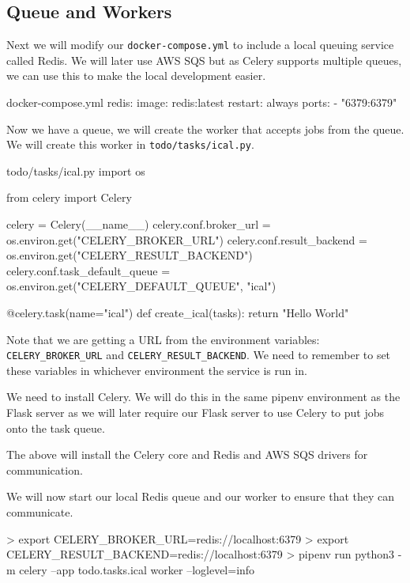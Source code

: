\documentclass{csse4400}
\begin{document}
\subsection{Queue and Workers}

Next we will modify our \texttt{docker-compose.yml} to include a local queuing service called Redis.
We will later use AWS SQS but as Celery supports multiple queues,
we can use this to make the local development easier.

\begin{code}[numbers=none]{docker-compose.yml}
  redis:
    image: redis:latest
    restart: always
    ports:
      - "6379:6379"
\end{code}

Now we have a queue,
we will create the worker that accepts jobs from the queue.
We will create this worker in \texttt{todo/tasks/ical.py}.

\begin{code}[language=python,numbers=none]{todo/tasks/ical.py}
import os

from celery import Celery

celery = Celery(__name__)
celery.conf.broker_url = os.environ.get("CELERY_BROKER_URL")
celery.conf.result_backend = os.environ.get("CELERY_RESULT_BACKEND")
celery.conf.task_default_queue = os.environ.get("CELERY_DEFAULT_QUEUE", "ical")

@celery.task(name="ical")
def create_ical(tasks):
    return "Hello World"
\end{code}

Note that we are getting a URL from the environment variables:
\texttt{CELERY\_BROKER\_URL} and \texttt{CELERY\_RESULT\_BACKEND}.
We need to remember to set these variables in whichever environment the service is run in.

We need to install Celery.
We will do this in the same pipenv environment as the Flask server as we will later require our Flask server to use Celery to put jobs onto the task queue.


The above will install the Celery core and Redis and AWS SQS drivers for communication.

We will now start our local Redis queue and our worker to ensure that they can communicate.


\begin{code}[language=bash,numbers=none]{}
> export CELERY_BROKER_URL=redis://localhost:6379
> export CELERY_RESULT_BACKEND=redis://localhost:6379
> pipenv run python3 -m celery --app todo.tasks.ical worker --loglevel=info
\end{code}
\end{document}
